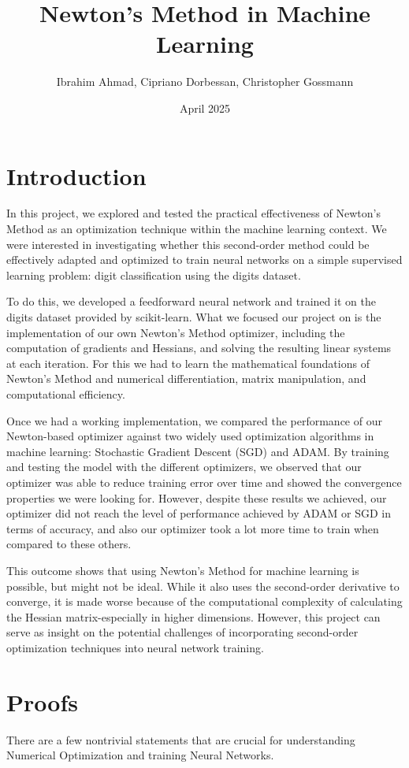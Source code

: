 \documentclass[10pt]{article}
\title{Newton's Method in Machine Learning }
\author{Ibrahim Ahmad, Cipriano Dorbessan, Christopher Gossmann}
\date{April 2025}
\begin{document}
\maketitle
\section*{Introduction}
In this project, we explored and tested the practical effectiveness of Newton's Method as an optimization technique within the machine learning context. We were interested in investigating whether this second-order method could be effectively adapted and optimized to train neural networks on a simple supervised learning problem: digit classification using the digits dataset.

To do this, we developed a feedforward neural network and trained it on the digits dataset provided by scikit-learn. What we focused our project on is the implementation of our own Newton's Method optimizer, including the computation of gradients and Hessians, and solving the resulting linear systems at each iteration. For this we had to learn the mathematical foundations of Newton's Method and numerical differentiation, matrix manipulation, and computational efficiency.

Once we had a working implementation, we compared the performance of our Newton-based optimizer against two widely used optimization algorithms in machine learning: Stochastic Gradient Descent (SGD) and ADAM. By training and testing the model with the different optimizers, we observed that our optimizer was able to reduce training error over time and showed the convergence properties we were looking for. However, despite these results we achieved, our optimizer did not reach the level of performance achieved by ADAM or SGD in terms of accuracy, and also our optimizer took a lot more time to train when compared to these others.

This outcome shows that using Newton's Method for machine learning is possible, but might not be ideal. While it also uses the second-order derivative to converge, it is made worse because of the computational complexity of calculating the Hessian matrix-especially in higher dimensions. However, this project can serve as insight on the potential challenges of incorporating second-order optimization techniques into neural network training.

\section*{Proofs}
There are a few nontrivial statements that are crucial for understanding Numerical Optimization and training Neural Networks.
\end{document}
